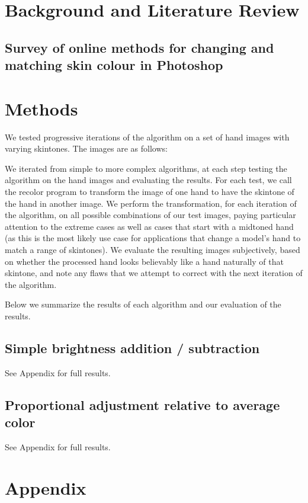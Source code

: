 \documentclass[12pt, a4paper]{article}
\begin{document}
\listoftables

\section{Background and Literature Review}
\subsection{Survey of online methods for changing and matching skin colour in Photoshop}

\section{Methods}
We tested progressive iterations of the algorithm on a set of hand images with varying skintones. The images are as follows:

We iterated from simple to more complex algorithms, at each step testing the algorithm on the hand images and evaluating the results. For each test, we call the recolor program to transform the image of one hand to have the skintone of the hand in another image. We perform the transformation, for each iteration of the algorithm, on all possible combinations of our test images, paying particular attention to the extreme cases as well as cases that start with a midtoned hand (as this is the most likely use case for applications that change a model's hand to match a range of skintones). We evaluate the resulting images subjectively, based on whether the processed hand looks believably like a hand naturally of that skintone, and note any flaws that we attempt to correct with the next iteration of the algorithm.

Below we summarize the results of each algorithm and our evaluation of the results.

\subsection{Simple brightness addition / subtraction}
See Appendix for full results.

\subsection{Proportional adjustment relative to average color}
See Appendix for full results.

\pagebreak

\section*{Appendix}

\pagebreak

\pagebreak

\end{document}
